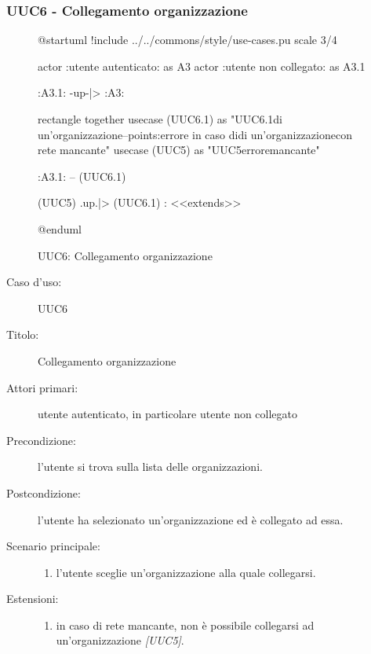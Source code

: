 \documentclass[../analisi-dei-requisiti.tex]{subfiles}
\begin{document}
\subsubsection{UUC6 - Collegamento organizzazione}%
\label{subsub:UUC6utente}

\begin{figure}[h!]
  \centering
  \begin{plantuml}
  @startuml
  !include ../../commons/style/use-cases.pu
  scale 3/4

  actor :utente autenticato: as A3
  actor :utente non collegato: as A3.1

  :A3.1: -up-|> :A3:

  rectangle {
    together {
      usecase (UUC6.1) as "UUC6.1\nSelezionamento di un'organizzazione\n--\nExtension points:\nVisualizzazione errore in caso di\nselezionamento di un'organizzazione\n con rete mancante"
      usecase (UUC5) as "UUC5\nVisualizzazione errore\nrete mancante"
    }
  }

  :A3.1: -- (UUC6.1)

  (UUC5) .up.|> (UUC6.1) : <<extends>>

  @enduml
  \end{plantuml}
  \caption{UUC6: Collegamento organizzazione}
  \label{fig:uuc6}
\end{figure}

\begin{description}
  \item[Caso d’uso:] UUC6
  \item[Titolo:] Collegamento organizzazione
  \item[Attori primari:] utente autenticato, in particolare utente non collegato
  \item[Precondizione:] l'utente si trova sulla lista delle organizzazioni.
  \item[Postcondizione:] l'utente ha selezionato un'organizzazione ed è collegato ad essa.
  \item[Scenario principale:]
        \begin{enumerate}
          \item l'utente sceglie un'organizzazione alla quale collegarsi.
        \end{enumerate}
  \item[Estensioni:]
        \begin{enumerate}
          \item in caso di rete mancante, non è possibile collegarsi ad un'organizzazione \emph{[UUC5]}.
        \end{enumerate}
\end{description}
\end{document}
